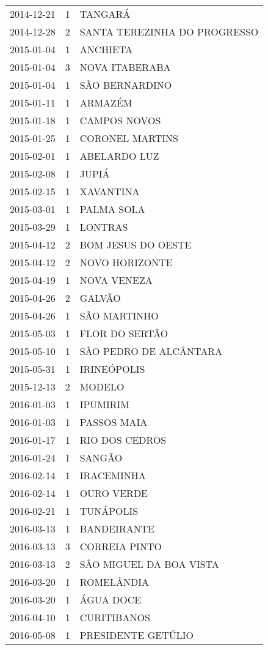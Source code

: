 \begin{longtable}[htbp]{ccl}
2014-12-21 & 1 & TANGARÁ \\
2014-12-28 & 2 & SANTA TEREZINHA DO PROGRESSO \\
2015-01-04 & 1 & ANCHIETA \\
2015-01-04 & 3 & NOVA ITABERABA \\
2015-01-04 & 1 & SÃO BERNARDINO \\
2015-01-11 & 1 & ARMAZÉM \\
2015-01-18 & 1 & CAMPOS NOVOS \\
2015-01-25 & 1 & CORONEL MARTINS \\
2015-02-01 & 1 & ABELARDO LUZ \\
2015-02-08 & 1 & JUPIÁ \\
2015-02-15 & 1 & XAVANTINA \\
2015-03-01 & 1 & PALMA SOLA \\
2015-03-29 & 1 & LONTRAS \\
2015-04-12 & 2 & BOM JESUS DO OESTE \\
2015-04-12 & 2 & NOVO HORIZONTE \\
2015-04-19 & 1 & NOVA VENEZA \\
2015-04-26 & 2 & GALVÃO \\
2015-04-26 & 1 & SÃO MARTINHO \\
2015-05-03 & 1 & FLOR DO SERTÃO \\
2015-05-10 & 1 & SÃO PEDRO DE ALCÂNTARA \\
2015-05-31 & 1 & IRINEÓPOLIS \\
2015-12-13 & 2 & MODELO \\
2016-01-03 & 1 & IPUMIRIM \\
2016-01-03 & 1 & PASSOS MAIA \\
2016-01-17 & 1 & RIO DOS CEDROS \\
2016-01-24 & 1 & SANGÃO \\
2016-02-14 & 1 & IRACEMINHA \\
2016-02-14 & 1 & OURO VERDE \\
2016-02-21 & 1 & TUNÁPOLIS \\
2016-03-13 & 1 & BANDEIRANTE \\
2016-03-13 & 3 & CORREIA PINTO \\
2016-03-13 & 2 & SÃO MIGUEL DA BOA VISTA \\
2016-03-20 & 1 & ROMELÂNDIA \\
2016-03-20 & 1 & ÁGUA DOCE \\
2016-04-10 & 1 & CURITIBANOS \\
2016-05-08 & 1 & PRESIDENTE GETÚLIO \\

\end{longtable}
